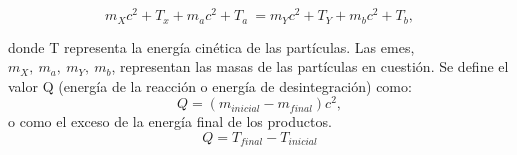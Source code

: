 \begin{equation*}
    m_Xc^2+T_x+m_ac^2+T_a\ = m_Yc^2+T_Y+m_bc^2+T_b,
\end{equation*}

\noindent donde T representa la energía cinética de las partículas. Las emes, $m_X,\ m_a,\ m_Y,\ m_b$, representan las masas de las partículas en cuestión. Se define el valor Q (energía de la reacción o energía de desintegración) como:
\begin{equation*}
    Q=(m_{inicial}-m_{final})c^2,  
\end{equation*}
\noindent o como el exceso de la energía final de los productos.
\begin{equation*}
   Q=T_{final}-T_{inicial}
\end{equation*}    

